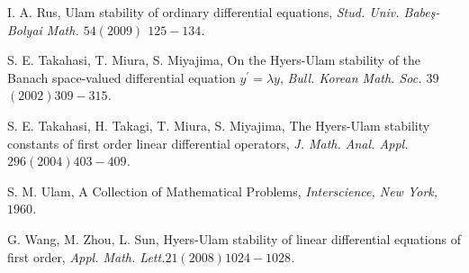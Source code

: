 \documentclass[a4paper,12pt]{report}
\begin{document}
\begin{thebibliography}
I. A. Rus, Ulam stability of ordinary differential equations, \textit{Stud. Univ. Babeş-Bolyai Math. $54 (2009)$ $125-134$.}

S. E. Takahasi, T. Miura, S. Miyajima, On the Hyers-Ulam \linebreak stability of the Banach space-valued differential equation \linebreak $y^{\prime}=\lambda y$, \textit{Bull. Korean Math. Soc. $39$ $(2002) 309-315$.}

S. E. Takahasi, H. Takagi, T. Miura, S. Miyajima, The Hyers-Ulam stability constants of first order linear differential \linebreak operators, \textit{J. Math. Anal. Appl.$ 296 (2004) 403-409$.}

S. M. Ulam, A Collection of Mathematical Problems,  \textit{Interscience, New York, $1960$.}

G. Wang, M. Zhou, L. Sun, Hyers-Ulam stability of linear \linebreak differential equations of first order, \textit{Appl. Math. Lett.$ 21 (2008) 1024-1028$.}
\end{thebibliography}
\end{document}
